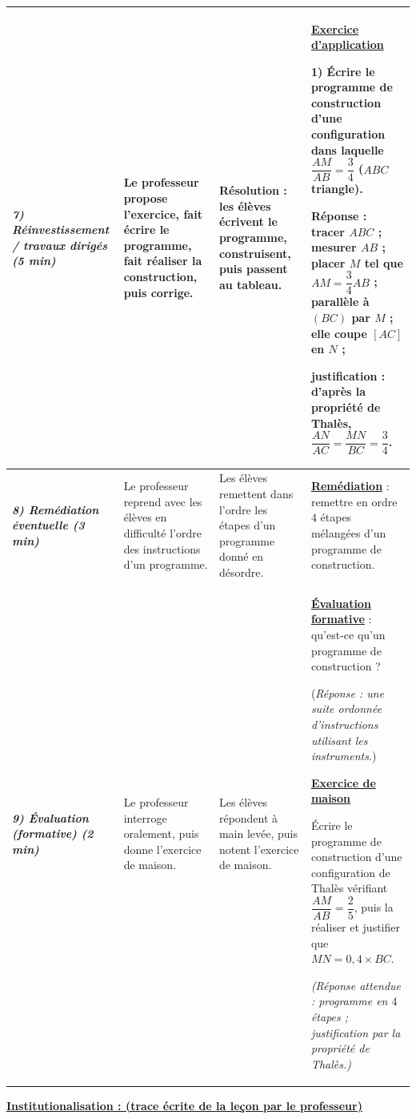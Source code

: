 \documentclass[10pt]{article}
\newcommand{\titreR}[1]{\underline{\textcolor{rougetitre}{\bfseries #1}}}
\newcommand{\app}{\titreR{Exercice d'application}}
\newcommand{\maison}{\underline{\textcolor{rougemaison}{\bfseries Exercice de maison}}}
\newcommand{\moment}[1]{\textbf{\itshape #1}}
\begin{document}
\begin{longtable}{|p{2.35cm}|p{5.35cm}|p{4.55cm}|p{13.85cm}|}
\moment{7) Réinvestissement / travaux dirigés (5 min)} &
Le professeur propose l'exercice, fait écrire le programme, fait réaliser la construction, puis corrige. &
\textbf{Résolution} : les élèves écrivent le programme, construisent, puis passent au tableau. &
\app \par
\textbf{1)} Écrire le programme de construction d'une configuration dans laquelle
$\dfrac{AM}{AB}=\dfrac{3}{4}$ ($ABC$ triangle). \par
\textbf{Réponse :} tracer $ABC$ ; mesurer $AB$ ; placer $M$ tel que
$AM=\dfrac{3}{4}AB$ ; parallèle à $(BC)$ par $M$ ; elle coupe $[AC]$ en $N$ ; \par
justification : d'après la propriété de Thalès,
$\dfrac{AN}{AC}=\dfrac{MN}{BC}=\dfrac{3}{4}$. \\ \hline

\moment{8) Remédiation éventuelle (3 min)} &
Le professeur reprend avec les élèves en difficulté  l'ordre des instructions d'un programme. &
Les élèves remettent dans l'ordre les étapes d'un programme donné en désordre. &
\titreR{Remédiation} : remettre en ordre $4$ étapes mélangées d'un programme de
construction. \\ \hline

\moment{9) Évaluation (formative) (2 min)} &
Le professeur interroge oralement, puis donne l'exercice de maison. &
Les élèves répondent à main levée, puis notent l'exercice de maison. &
\titreR{Évaluation formative} : qu'est-ce qu'un programme de construction ? \par
(\textit{Réponse : une suite ordonnée d'instructions utilisant les instruments}.) \par
\maison \par
Écrire le programme de construction d'une configuration de Thalès vérifiant
$\dfrac{AM}{AB}=\dfrac{2}{5}$, puis la réaliser et justifier que $MN=0{,}4\times BC$. \par
\textit{(Réponse attendue : programme en $4$ étapes ; justification par la propriété
de Thalès.)} \\ \hline
\end{longtable}

\begin{center}
\underline{\textcolor{rougetitre}{\large\bfseries Institutionalisation \; : \; (trace écrite de la leçon par le professeur)}}
\end{center}
\end{document}
